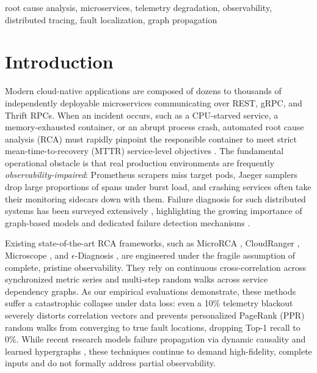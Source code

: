 \documentclass[conference]{IEEEtran}
\begin{document}
\begin{IEEEkeywords}
root cause analysis, microservices, telemetry degradation, observability, distributed tracing, fault localization, graph propagation
\end{IEEEkeywords}

\section{Introduction}

Modern cloud-native applications are composed of dozens to thousands of independently deployable microservices communicating over REST, gRPC, and Thrift RPCs. When an incident occurs, such as a CPU-starved service, a memory-exhausted container, or an abrupt process crash, automated root cause analysis (RCA) must rapidly pinpoint the responsible container to meet strict mean-time-to-recovery (MTTR) service-level objectives \cite{chen2014}. The fundamental operational obstacle is that real production environments are frequently \textit{observability-impaired}: Prometheus scrapers miss target pods, Jaeger samplers drop large proportions of spans under burst load, and crashing services often take their monitoring sidecars down with them. Failure diagnosis for such distributed systems has been surveyed extensively \cite{zhang2024survey}, highlighting the growing importance of graph-based models \cite{nguyen2022} and dedicated failure detection mechanisms \cite{tariq2026}.

Existing state-of-the-art RCA frameworks, such as MicroRCA \cite{wu2020}, CloudRanger \cite{wang2018}, Microscope \cite{lin2018}, and $\epsilon$-Diagnosis \cite{shan2019}, are engineered under the fragile assumption of complete, pristine observability. They rely on continuous cross-correlation across synchronized metric series and multi-step random walks across service dependency graphs. As our empirical evaluations demonstrate, these methods suffer a catastrophic collapse under data loss: even a 10\% telemetry blackout severely distorts correlation vectors and prevents personalized PageRank (PPR) random walks from converging to true fault locations, dropping Top-1 recall to 0\%. While recent research models failure propagation via dynamic causality and learned hypergraphs \cite{xie2023impact,zhang2025dyna,xie2025hyper}, these techniques continue to demand high-fidelity, complete inputs and do not formally address partial observability.
\end{document}

